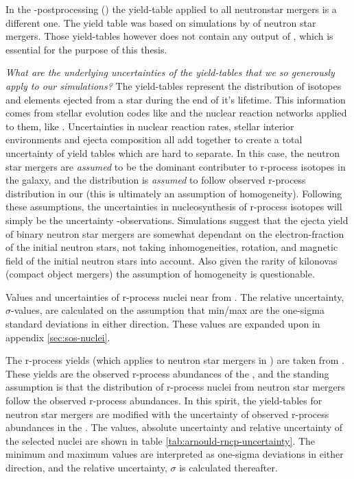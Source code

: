 In the \eris-postprocessing () the yield-table applied to all neutronstar mergers is a different one.
The yield table was based on simulations by  of neutron star mergers. Those yield-tables however does not contain any output of , which is essential for the purpose of this thesis.

\textit{What are the underlying uncertainties of the yield-tables that we so generously apply to our simulations?}
The yield-tables represent the distribution of isotopes and elements ejected from a star during the end of it's lifetime. This information comes from stellar evolution codes like \cite{paxton11} and the nuclear reaction networks applied to them, like \cite{pignatari16}.
Uncertainties in nuclear reaction rates, stellar interior environments and ejecta composition all add together to create a total uncertainty of yield tables which are hard to separate.
In this case, the neutron star mergers are \textit{assumed} to be the dominant contributer to r-process isotopes in the galaxy, and the distribution is \textit{assumed} to follow observed r-process distribution in our \sos (this is ultimately an assumption of homogeneity).
Following these assumptions, the uncertainties in nucleosynthesis of r-process isotopes will simply be the uncertainty \sos-observations\cite{arnould07}.
Simulations suggest that the ejecta yield of binary neutron star mergers are somewhat dependant on the electron-fraction of the initial neutron stars, not taking inhomogeneities, rotation, and magnetic field of the initial neutron stars into account. Also given the rarity of kilonovas (compact object mergers) the assumption of homogeneity is questionable.



\begin{table}[h]
  \centering
  
  \caption[Values and uncertainties of observed r-process abundances in the \sos]{\label{tab:arnould-rncp-uncertainty}
    Values and uncertainties of r-process nuclei near  from .
    The relative uncertainty, $\sigma$-values, are calculated on the assumption that min/max are the one-sigma standard deviations in either direction.
    These values are expanded upon in appendix \ref{sec:sos-nuclei}.
  }
\end{table}

The r-process yields (which applies to neutron star mergers in \omegamodel) are taken from .
These yields are the observed r-process abundances of the \sos, and the standing assumption is that the distribution of r-process nuclei from neutron star mergers follow the observed r-process abundances.
In this spirit, the yield-tables for neutron star mergers are modified with the uncertainty of observed r-process abundances in the \sos.
The values, absolute uncertainty and relative uncertainty of the selected nuclei are shown in table \ref{tab:arnould-rncp-uncertainty}.
The minimum and maximum values are interpreted as one-sigma deviations in either direction, and the relative uncertainty, $\sigma$ is calculated thereafter.


